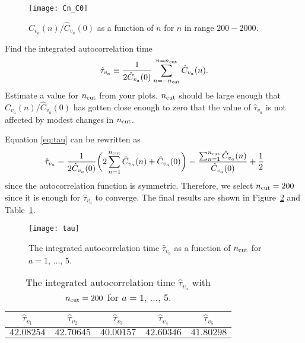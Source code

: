 \begin{figure}[h]
    \centering
    \texttt{[image: Cn\_C0]}
    \caption{\(\hat{C}_{v_a}(n) / \hat{C}_{v_a}(0)\) as a function of \(n\)
        for \(n\) in range \(200 - 2000\).}
    \label{fig:truecorlarge}
\end{figure}


\Question{} Find the integrated autocorrelation time
%
\begin{equation}\label{eq:tau}
    \hat{\tau}_{v_a} \equiv \frac{ 1 }{ 2 \hat{C}_{v_a}(0) }
    \sum_{n=-n_\textnormal{cut}}^{n=n_\textnormal{cut}} \hat{C}_{v_a}(n).
\end{equation}
%
Estimate a value for \(n_\textnormal{cut}\) from your plots.
\(n_\textnormal{cut}\) should be large enough that \(\hat{C}_{v_a}(n) / \hat{C}_{v_a}(0)\)
has gotten close enough to zero that the value of \(\hat{\tau}_{v_a}\)
is not affected by modest changes in \(n_\textnormal{cut}\).

\Answer{}
Equation \eqref{eq:tau} can be rewritten as
%
\begin{equation}
    \hat{\tau}_{v_a} = \frac{ 1 }{ 2 \hat{C}_{v_a}(0) }
    \biggl( 2\sum_{n=1}^{n_\textnormal{cut}} \hat{C}_{v_a}(n) + \hat{C}_{v_a}(0) \biggr)
    = \frac{ \sum_{n=1}^{n_\textnormal{cut}} \hat{C}_{v_a}(n) }{ \hat{C}_{v_a}(0) }
    + \frac{ 1 }{ 2 }
\end{equation}
%
since the autocorrelation function is symmetric.
Therefore, we select \(n_\textnormal{cut} = 200\) since it is enough for \(\hat{\tau}_{v_a}\)
to converge.
The final results are shown in Figure~\ref{fig:tau} and Table~\ref{tab:tau}.

\begin{figure}[h]
    \centering
    \texttt{[image: tau]}
    \caption{The integrated autocorrelation time \(\hat{\tau}_{v_a}\) as a
        function of \(n_\textnormal{cut}\) for \(a = 1\), \(\ldots\), \(5\).}
    \label{fig:tau}
\end{figure}

\begin{table}
    \centering
    \caption{The integrated autocorrelation time \(\hat{\tau}_{v_a}\) with
        \(n_\textnormal{cut} = 200\) for \(a = 1\), \(\ldots\), \(5\).}
    \label{tab:tau}
    \begin{tabular}{@{}ccccc@{}}
        \toprule
        \(\hat{\tau}_{v_1}\) & \(\hat{\tau}_{v_2}\) & \(\hat{\tau}_{v_3}\) & \(\hat{\tau}_{v_4}\) & \(\hat{\tau}_{v_5}\) \\
        \midrule
        \(42.08254\)         & \(42.70645\)         & \(40.00157\)         & \(42.60346\)         & \(41.80298\)         \\
        \bottomrule
    \end{tabular}
\end{table}


